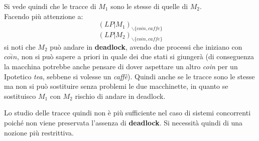 \begin{esempio}
\begin{center}
  \end{center}
  Si vede quindi che le tracce di $M_1$ sono le stesse di quelle di $M_2$.\\
  Facendo più attenzione a:
  \[(LP|M_1)_{\backslash\{coin, caffe\}}\]
  \[(LP|M_2)_{\backslash\{coin, caffe\}}\]
  si noti  che $M_2$ può andare in \textbf{deadlock}, avendo due processi che iniziano con
  $\overline{coin}$, non si può sapere a priori in quale dei due stati si giungerà (di conseguenza la macchina potrebbe anche pensare di dover aspettare un altro \textit{coin} per un Ipotetico \textit{tea}, sebbene si volesse un \textit{caffè}). Quindi  anche se le tracce sono le stesse ma non si può sostituire senza problemi le
  due macchinette, in quanto se sostituisco $M_1$ con $M_2$ rischio di andare in
  deadlock.
  \label{coffe}
\end{esempio}
Lo studio delle tracce quindi non è più sufficiente nel caso di sistemi
concorrenti poiché non viene preservata l'assenza di \textbf{deadlock}. Si necessità quindi di una nozione più restrittiva.
